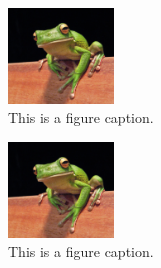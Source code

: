 \documentclass{article}
\begin{document}
\begin{figure}
	\centering
	\includegraphics[width=0.25\textwidth]{frog.jpg}
	\caption{\label{fig:frog1}This is a figure caption.}
\end{figure}

\lipsum[1]

\begin{figure}
	\centering
	\includegraphics[width=0.25\textwidth]{frog.jpg}
	\caption{\label{fig:frog2}This is a figure caption.}
\end{figure}

\lipsum[2-3]
\end{document}
